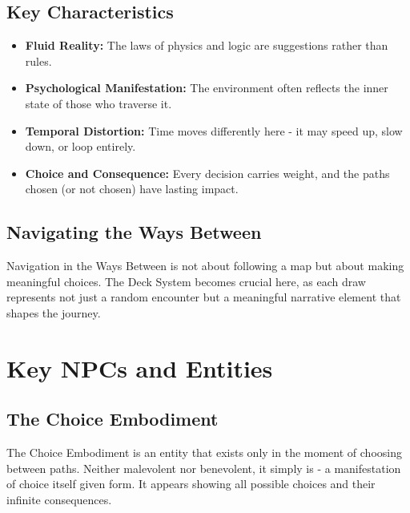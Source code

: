 \documentclass[11pt]{article}
\begin{document}
\subsection{Key Characteristics}

\begin{itemize}
\item \textbf{Fluid Reality:} The laws of physics and logic are suggestions rather than rules.
\item \textbf{Psychological Manifestation:} The environment often reflects the inner state of those who traverse it.
\item \textbf{Temporal Distortion:} Time moves differently here - it may speed up, slow down, or loop entirely.
\item \textbf{Choice and Consequence:} Every decision carries weight, and the paths chosen (or not chosen) have lasting impact.
\end{itemize}

\subsection{Navigating the Ways Between}

Navigation in the Ways Between is not about following a map but about making meaningful choices. The Deck System becomes crucial here, as each draw represents not just a random encounter but a meaningful narrative element that shapes the journey.

\section{Key NPCs and Entities}

\subsection{The Choice Embodiment}

The Choice Embodiment is an entity that exists only in the moment of choosing between paths. Neither malevolent nor benevolent, it simply is - a manifestation of choice itself given form. It appears showing all possible choices and their infinite consequences.
\end{document}
